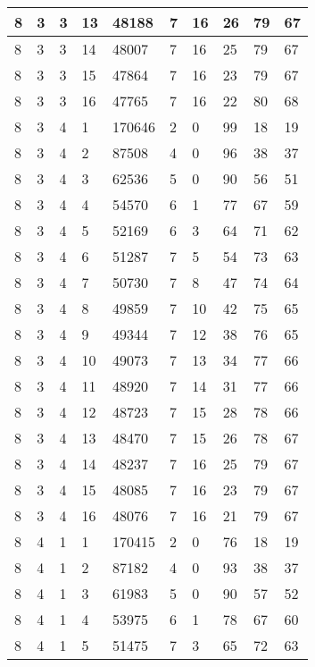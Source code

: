 \begin{table}[!ht]
\begin{tabular}{|l|l|l|l|l|l|l|l|l|l|}
        8 & 3 & 3 & 13 & 48188 & 7 & 16 & 26 & 79 & 67 \\ \hline
        8 & 3 & 3 & 14 & 48007 & 7 & 16 & 25 & 79 & 67 \\ \hline
        8 & 3 & 3 & 15 & 47864 & 7 & 16 & 23 & 79 & 67 \\ \hline
        8 & 3 & 3 & 16 & 47765 & 7 & 16 & 22 & 80 & 68 \\ \hline
        8 & 3 & 4 & 1 & 170646 & 2 & 0 & 99 & 18 & 19 \\ \hline
        8 & 3 & 4 & 2 & 87508 & 4 & 0 & 96 & 38 & 37 \\ \hline
        8 & 3 & 4 & 3 & 62536 & 5 & 0 & 90 & 56 & 51 \\ \hline
        8 & 3 & 4 & 4 & 54570 & 6 & 1 & 77 & 67 & 59 \\ \hline
        8 & 3 & 4 & 5 & 52169 & 6 & 3 & 64 & 71 & 62 \\ \hline
        8 & 3 & 4 & 6 & 51287 & 7 & 5 & 54 & 73 & 63 \\ \hline
        8 & 3 & 4 & 7 & 50730 & 7 & 8 & 47 & 74 & 64 \\ \hline
        8 & 3 & 4 & 8 & 49859 & 7 & 10 & 42 & 75 & 65 \\ \hline
        8 & 3 & 4 & 9 & 49344 & 7 & 12 & 38 & 76 & 65 \\ \hline
        8 & 3 & 4 & 10 & 49073 & 7 & 13 & 34 & 77 & 66 \\ \hline
        8 & 3 & 4 & 11 & 48920 & 7 & 14 & 31 & 77 & 66 \\ \hline
        8 & 3 & 4 & 12 & 48723 & 7 & 15 & 28 & 78 & 66 \\ \hline
        8 & 3 & 4 & 13 & 48470 & 7 & 15 & 26 & 78 & 67 \\ \hline
        8 & 3 & 4 & 14 & 48237 & 7 & 16 & 25 & 79 & 67 \\ \hline
        8 & 3 & 4 & 15 & 48085 & 7 & 16 & 23 & 79 & 67 \\ \hline
        8 & 3 & 4 & 16 & 48076 & 7 & 16 & 21 & 79 & 67 \\ \hline
        8 & 4 & 1 & 1 & 170415 & 2 & 0 & 76 & 18 & 19 \\ \hline
        8 & 4 & 1 & 2 & 87182 & 4 & 0 & 93 & 38 & 37 \\ \hline
        8 & 4 & 1 & 3 & 61983 & 5 & 0 & 90 & 57 & 52 \\ \hline
        8 & 4 & 1 & 4 & 53975 & 6 & 1 & 78 & 67 & 60 \\ \hline
        8 & 4 & 1 & 5 & 51475 & 7 & 3 & 65 & 72 & 63 \\ \hline

\end{tabular}
\end{table}
